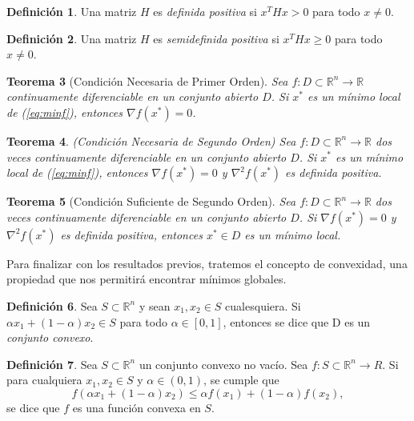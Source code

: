 \documentclass[11pt,a4paper]{book}
\newtheorem{theorem}{Teorema}[chapter]
\theoremstyle{definition}
\newtheorem{definition}[theorem]{Definición}
\theoremstyle{remark}
\begin{document}
\begin{definition}
	Una matriz $H$ es \textit{definida positiva} si $x^THx > 0$ para todo $x \neq 0$.
\end{definition}

\begin{definition}
	Una matriz $H$ es \textit{semidefinida positiva} si $x^THx \geq 0$ para todo $x \neq 0$.
\end{definition}

\begin{theorem}[Condición Necesaria de Primer Orden]
	Sea $f:D\subset \mathbb{R}^n \rightarrow \mathbb{R}$ continuamente diferenciable en un
	conjunto abierto $D$. Si $x^*$ es un mínimo local de (\ref{eq:minf}), entonces
	$\nabla f(x^*) = 0$.
\end{theorem}

\begin{theorem}
	(Condición Necesaria de Segundo Orden)
	Sea $f:D\subset \mathbb{R}^n \rightarrow \mathbb{R}$ dos veces continuamente diferenciable
	en un conjunto abierto $D$. Si $x^*$ es un mínimo local de (\ref{eq:minf}), entonces
	$\nabla f(x^*) = 0$ y $\nabla^2 f(x^*)$ es definida positiva.
\end{theorem}

\begin{theorem}[Condición Suficiente de Segundo Orden]
	Sea $f:D\subset \mathbb{R}^n \rightarrow \mathbb{R}$ dos veces continuamente diferenciable
	en un conjunto abierto $D$. Si $\nabla f(x^*) = 0$ y $\nabla^2 f(x^*)$ es definida positiva,
	entonces $x^* \in D$ es un mínimo local.
\end{theorem}

Para finalizar con los resultados previos, tratemos el concepto de convexidad, una propiedad
que nos permitirá encontrar mínimos globales.

\begin{definition}
	Sea $S\subset \mathbb{R}^n$ y sean $x_1, x_2 \in S$ cualesquiera. Si
	$\alpha x_1 + (1 - \alpha)x_2 \in S$ para todo $\alpha \in [0,1]$, entonces se dice que D
	es un \textit{conjunto convexo}.
\end{definition}
\begin{definition}
	Sea $S \subset \mathbb{R}^n$ un conjunto convexo no vacío. Sea $f: S \subset \mathbb{R}^n
	\rightarrow R$. Si para cualquiera $x_1, x_2 \in S$ y
	$\alpha \in (0,1)$, se cumple que
	\begin{equation}
		f(\alpha x_1 + (1-\alpha)x_2) \leq \alpha f(x_1) + (1-\alpha)f(x_2),
	\end{equation}
	se dice que $f$ es una función convexa en $S$.
\end{definition}
\end{document}
